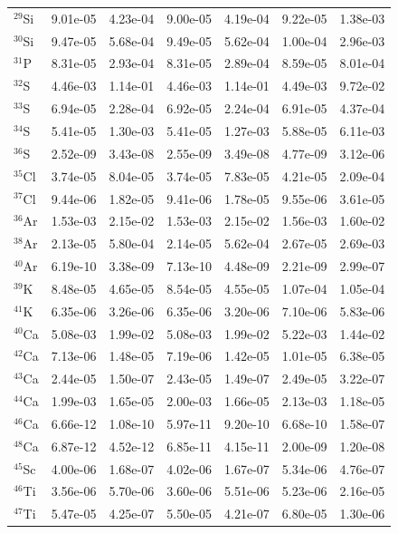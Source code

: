 \begin{table}
\begin{tabular}{l|cc|cc|cc}
$^{29}$Si & 9.01e-05 & 4.23e-04 & 9.00e-05 & 4.19e-04 & 9.22e-05 & 1.38e-03\\
$^{30}$Si & 9.47e-05 & 5.68e-04 & 9.49e-05 & 5.62e-04 & 1.00e-04 & 2.96e-03\\
$^{31}$P & 8.31e-05 & 2.93e-04 & 8.31e-05 & 2.89e-04 & 8.59e-05 & 8.01e-04\\
$^{32}$S & 4.46e-03 & 1.14e-01 & 4.46e-03 & 1.14e-01 & 4.49e-03 & 9.72e-02\\
$^{33}$S & 6.94e-05 & 2.28e-04 & 6.92e-05 & 2.24e-04 & 6.91e-05 & 4.37e-04\\
$^{34}$S & 5.41e-05 & 1.30e-03 & 5.41e-05 & 1.27e-03 & 5.88e-05 & 6.11e-03\\
$^{36}$S & 2.52e-09 & 3.43e-08 & 2.55e-09 & 3.49e-08 & 4.77e-09 & 3.12e-06\\
$^{35}$Cl & 3.74e-05 & 8.04e-05 & 3.74e-05 & 7.83e-05 & 4.21e-05 & 2.09e-04\\
$^{37}$Cl & 9.44e-06 & 1.82e-05 & 9.41e-06 & 1.78e-05 & 9.55e-06 & 3.61e-05\\
$^{36}$Ar & 1.53e-03 & 2.15e-02 & 1.53e-03 & 2.15e-02 & 1.56e-03 & 1.60e-02\\
$^{38}$Ar & 2.13e-05 & 5.80e-04 & 2.14e-05 & 5.62e-04 & 2.67e-05 & 2.69e-03\\
$^{40}$Ar & 6.19e-10 & 3.38e-09 & 7.13e-10 & 4.48e-09 & 2.21e-09 & 2.99e-07\\
$^{39}$K & 8.48e-05 & 4.65e-05 & 8.54e-05 & 4.55e-05 & 1.07e-04 & 1.05e-04\\
$^{41}$K & 6.35e-06 & 3.26e-06 & 6.35e-06 & 3.20e-06 & 7.10e-06 & 5.83e-06\\
$^{40}$Ca & 5.08e-03 & 1.99e-02 & 5.08e-03 & 1.99e-02 & 5.22e-03 & 1.44e-02\\
$^{42}$Ca & 7.13e-06 & 1.48e-05 & 7.19e-06 & 1.42e-05 & 1.01e-05 & 6.38e-05\\
$^{43}$Ca & 2.44e-05 & 1.50e-07 & 2.43e-05 & 1.49e-07 & 2.49e-05 & 3.22e-07\\
$^{44}$Ca & 1.99e-03 & 1.65e-05 & 2.00e-03 & 1.66e-05 & 2.13e-03 & 1.18e-05\\
$^{46}$Ca & 6.66e-12 & 1.08e-10 & 5.97e-11 & 9.20e-10 & 6.68e-10 & 1.58e-07\\
$^{48}$Ca & 6.87e-12 & 4.52e-12 & 6.85e-11 & 4.15e-11 & 2.00e-09 & 1.20e-08\\
$^{45}$Sc & 4.00e-06 & 1.68e-07 & 4.02e-06 & 1.67e-07 & 5.34e-06 & 4.76e-07\\
$^{46}$Ti & 3.56e-06 & 5.70e-06 & 3.60e-06 & 5.51e-06 & 5.23e-06 & 2.16e-05\\
$^{47}$Ti & 5.47e-05 & 4.25e-07 & 5.50e-05 & 4.21e-07 & 6.80e-05 & 1.30e-06\\

\end{tabular}
\end{table}
